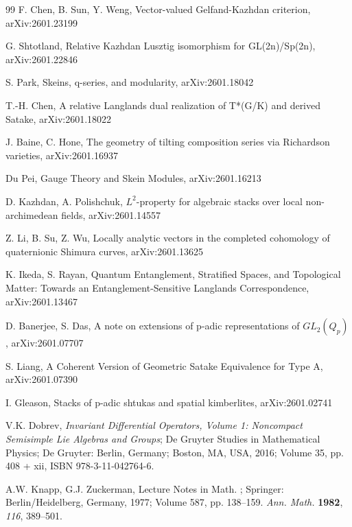 \documentclass[a4paper]{jpconf}
\begin{document}
\begin{thebibliography}{99}
 F. Chen, B. Sun, Y. Weng,
Vector-valued Gelfand-Kazhdan criterion,
 arXiv:2601.23199

 G. Shtotland,
Relative Kazhdan Lusztig isomorphism for    GL(2n)/Sp(2n),
arXiv:2601.22846


 S. Park,
Skeins, q-series, and modularity,
arXiv:2601.18042


 T.-H. Chen,
A relative Langlands dual realization of T*(G/K) and derived Satake,
arXiv:2601.18022


 J. Baine, C. Hone,
The geometry of tilting composition series via Richardson varieties,
arXiv:2601.16937


 Du Pei,
Gauge Theory and Skein Modules,
arXiv:2601.16213


 D. Kazhdan, A. Polishchuk,
$L^2$-property for algebraic stacks over local non-archimedean fields,
arXiv:2601.14557


 Z. Li, B. Su, Z. Wu,
Locally analytic vectors in the completed cohomology of quaternionic Shimura curves,
arXiv:2601.13625


 K. Ikeda, S. Rayan,
Quantum Entanglement, Stratified Spaces, and Topological Matter: Towards an Entanglement-Sensitive Langlands Correspondence,
arXiv:2601.13467


D. Banerjee, S. Das,
A note on extensions of p-adic representations of $GL_2(Q_p)$,
arXiv:2601.07707


 S. Liang,
A Coherent Version of Geometric Satake Equivalence for Type A,
arXiv:2601.07390

 I. Gleason,
Stacks of p-adic shtukas and spatial kimberlites,
arXiv:2601.02741



 V.K. Dobrev, {\it Invariant Differential Operators,
Volume 1: Noncompact Semisimple Lie Algebras and Groups}; De Gruyter
Studies in Mathematical Physics; De Gruyter: Berlin, Germany; Boston, MA, USA, 2016; Volume 35, pp. 408 + xii, ISBN 978-3-11-042764-6.%

 A.W. Knapp, G.J.  Zuckerman,
 Lecture Notes in {Math.}
; Springer:  Berlin/Heidelberg, Germany, 1977;  Volume 587, pp. 138--159.
\emph{{Ann. Math.}
} {\bf 1982},  \emph{116}, 389--501.




\end{thebibliography}
\end{document}
